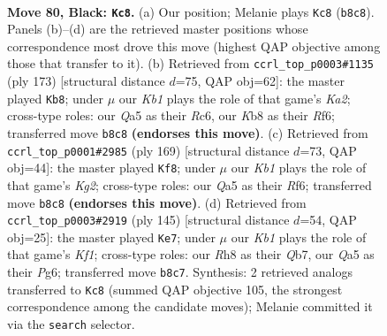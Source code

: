 \documentclass[11pt]{article}
\begin{document}
\clearpage

\begin{figure}[p]\centering
\begin{subfigure}{0.46\textwidth}\centering
\resizebox{\linewidth}{!}{%
\newchessgame
\chessboard[
  setfen={1k3r1r/p5p1/7p/q5PP/3P4/4P3/7N/1Q2b2K b - - 2 80},
  showmover=false,
  pgfstyle=straightmove, color=movearrow, markmove={b8-c8}
]}
\caption{}
\end{subfigure}\hfill
\begin{subfigure}{0.46\textwidth}\centering
\resizebox{\linewidth}{!}{%
\newchessgame
\chessboard[
  setfen={8/k5Q1/1pr2rp1/p6p/P4P1K/1P4P1/7P/8 b - - 30 87},
  showmover=false,
  pgfstyle=straightmove, color=movearrow, markmove={a7-b8}
]}
\caption{}
\end{subfigure}
\\[4pt]
\begin{subfigure}{0.46\textwidth}\centering
\resizebox{\linewidth}{!}{%
\newchessgame
\chessboard[
  setfen={8/2Q3k1/1p3r1p/1P5p/P5r1/6PK/8/8 b - - 2 85},
  showmover=false,
  pgfstyle=straightmove, color=movearrow, markmove={g7-f8}
]}
\caption{}
\end{subfigure}\hfill
\begin{subfigure}{0.46\textwidth}\centering
\resizebox{\linewidth}{!}{%
\newchessgame
\chessboard[
  setfen={2r2k1Q/1q3p2/4p1p1/2r1N1P1/3P4/6K1/5P2/8 b - - 9 73},
  showmover=false,
  pgfstyle=straightmove, color=movearrow, markmove={f8-e7}
]}
\caption{}
\end{subfigure}
\caption{\textbf{Move 80, Black: \texttt{Kc8}.} (a) Our position; Melanie plays \texttt{Kc8} (\texttt{b8c8}). Panels (b)--(d) are the retrieved master positions whose correspondence most drove this move (highest QAP objective among those that transfer to it). (b) Retrieved from \texttt{ccrl\_top\_p0003\#1135} (ply 173) [structural distance $d$=75, QAP obj=62]: the master played \texttt{Kb8}; under $\mu$ our \emph{Kb1} plays the role of that game's \emph{Ka2}; cross-type roles: our \emph{Q}a5 as their \emph{R}c6, our \emph{K}b8 as their \emph{R}f6; transferred move \texttt{b8c8} \textbf{(endorses this move)}. (c) Retrieved from \texttt{ccrl\_top\_p0001\#2985} (ply 169) [structural distance $d$=73, QAP obj=44]: the master played \texttt{Kf8}; under $\mu$ our \emph{Kb1} plays the role of that game's \emph{Kg2}; cross-type roles: our \emph{Q}a5 as their \emph{R}f6; transferred move \texttt{b8c8} \textbf{(endorses this move)}. (d) Retrieved from \texttt{ccrl\_top\_p0003\#2919} (ply 145) [structural distance $d$=54, QAP obj=25]: the master played \texttt{Ke7}; under $\mu$ our \emph{Kb1} plays the role of that game's \emph{Kf1}; cross-type roles: our \emph{R}h8 as their \emph{Q}b7, our \emph{Q}a5 as their \emph{P}g6; transferred move \texttt{b8c7}. Synthesis: 2 retrieved analogs transferred to \texttt{Kc8} (summed QAP objective 105, the strongest correspondence among the candidate moves); Melanie committed it via the \texttt{search} selector.}
\label{fig:thought-m159}
\end{figure}
\end{document}
